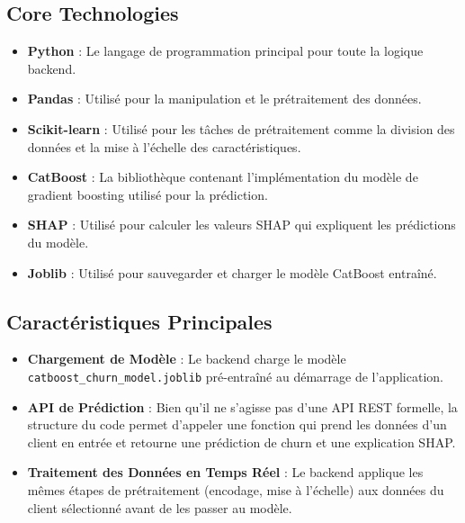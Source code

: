 \subsection{Core Technologies}
\begin{itemize}
    \item \textbf{Python} : Le langage de programmation principal pour toute la logique backend.
    \item \textbf{Pandas} : Utilisé pour la manipulation et le prétraitement des données.
    \item \textbf{Scikit-learn} : Utilisé pour les tâches de prétraitement comme la division des données et la mise à l'échelle des caractéristiques.
    \item \textbf{CatBoost} : La bibliothèque contenant l'implémentation du modèle de gradient boosting utilisé pour la prédiction.
    \item \textbf{SHAP} : Utilisé pour calculer les valeurs SHAP qui expliquent les prédictions du modèle.
    \item \textbf{Joblib} : Utilisé pour sauvegarder et charger le modèle CatBoost entraîné.
\end{itemize}

\subsection{Caractéristiques Principales}
\begin{itemize}
    \item \textbf{Chargement de Modèle} : Le backend charge le modèle \texttt{catboost\_churn\_model.joblib} pré-entraîné au démarrage de l'application.
    \item \textbf{API de Prédiction} : Bien qu'il ne s'agisse pas d'une API REST formelle, la structure du code permet d'appeler une fonction qui prend les données d'un client en entrée et retourne une prédiction de churn et une explication SHAP.
    \item \textbf{Traitement des Données en Temps Réel} : Le backend applique les mêmes étapes de prétraitement (encodage, mise à l'échelle) aux données du client sélectionné avant de les passer au modèle.
\end{itemize}

